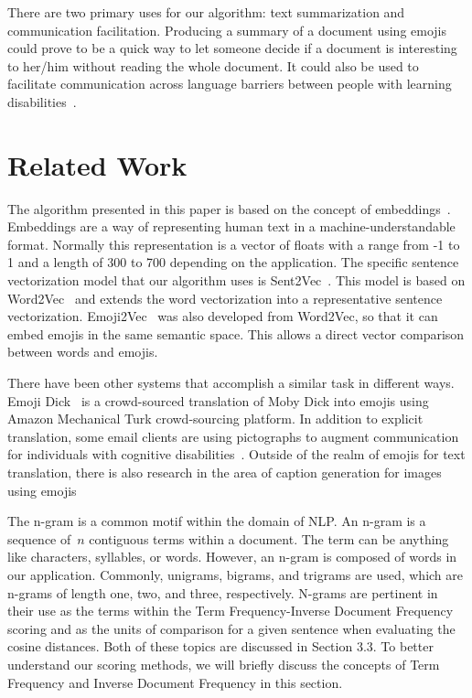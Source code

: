 \documentclass{article}[10]
\begin{document}
There are two primary uses for our algorithm: text summarization and
communication facilitation. Producing a summary of a document using emojis could
prove to be a quick way to let someone decide if a document is interesting to
her/him without reading the whole document. It could also be used to facilitate
communication across language barriers between people with learning
disabilities~\cite{vandeghinste2017translating}.

\section{Related Work}

The algorithm presented in this paper is based on the concept of
embeddings~\cite{WhatAreW70}. Embeddings are a way of representing human text in
a machine-understandable format. Normally this representation is a vector of
floats with a range from -1 to 1 and a length of 300 to 700 depending on the
application. The specific sentence vectorization model that our algorithm uses
is Sent2Vec~\cite{pg2017unsu}. This model is based on
Word2Vec~\cite{mikolov2013efficient} and extends the word vectorization into a
representative sentence vectorization. Emoji2Vec~\cite{Eisner_2016} was also
developed from Word2Vec, so that it can embed emojis in the same semantic space.
This allows a direct vector comparison between words and emojis.

There have been other systems that accomplish a similar task in different ways.
Emoji Dick~\cite{radford2016telephone} is a crowd-sourced translation of Moby
Dick into emojis using Amazon Mechanical Turk crowd-sourcing platform. In
addition to explicit translation, some email clients are using pictographs to
augment communication for individuals with cognitive
disabilities~\cite{vandeghinste2017translating}. Outside of the realm of emojis
for text translation, there is also research in the area of caption generation
for images using
emojis~\cite{mazoure-etal-2018-emojigan,cappallo2015image2emoji}

The n-gram is a common motif within the domain of NLP\@. An n-gram is a sequence
of~\(n\) contiguous terms within a document. The term can be anything like
characters, syllables, or words. However, an n-gram is composed of words in our
application. Commonly, unigrams, bigrams, and trigrams are used, which are
n-grams of length one, two, and three, respectively. N-grams are pertinent in
their use as the terms within the Term Frequency-Inverse Document Frequency
scoring and as the units of comparison for a given sentence when evaluating the
cosine distances. Both of these topics are discussed in Section 3.3. To better
understand our scoring methods, we will briefly discuss the concepts of Term
Frequency and Inverse Document Frequency in this section.
\end{document}
